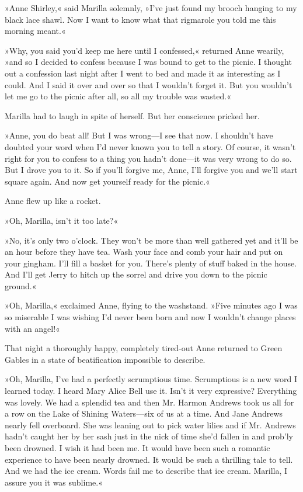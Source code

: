 »Anne Shirley,« said Marilla solemnly, »I’ve just found my brooch hanging to my black lace shawl. Now I want to know what that rigmarole you told me this morning meant.«

»Why, you said you’d keep me here until I confessed,« returned Anne wearily, »and so I decided to confess because I was bound to get to the picnic. I thought out a confession last night after I went to bed and made it as interesting as I could. And I said it over and over so that I wouldn’t forget it. But you wouldn’t let me go to the picnic after all, so all my trouble was wasted.«

Marilla had to laugh in spite of herself. But her conscience pricked her.

»Anne, you do beat all! But I was wrong—I see that now. I shouldn’t have doubted your word when I’d never known you to tell a story. Of course, it wasn’t right for you to confess to a thing you hadn’t done—it was very wrong to do so. But I drove you to it. So if you’ll forgive me, Anne, I’ll forgive you and we’ll start square again. And now get yourself ready for the picnic.«

Anne flew up like a rocket.

»Oh, Marilla, isn’t it too late?«

»No, it’s only two o’clock. They won’t be more than well gathered yet and it’ll be an hour before they have tea. Wash your face and comb your hair and put on your gingham. I’ll fill a basket for you. There’s plenty of stuff baked in the house. And I’ll get Jerry to hitch up the sorrel and drive you down to the picnic ground.«

»Oh, Marilla,« exclaimed Anne, flying to the washstand. »Five minutes ago I was so miserable I was wishing I’d never been born and now I wouldn’t change places with an angel!«

That night a thoroughly happy, completely tired-out Anne returned to Green Gables in a state of beatification impossible to describe.

»Oh, Marilla, I’ve had a perfectly scrumptious time. Scrumptious is a new word I learned today. I heard Mary Alice Bell use it. Isn’t it very expressive? Everything was lovely. We had a splendid tea and then Mr. Harmon Andrews took us all for a row on the Lake of Shining Waters—six of us at a time. And Jane Andrews nearly fell overboard. She was leaning out to pick water lilies and if Mr. Andrews hadn’t caught her by her sash just in the nick of time she’d fallen in and prob’ly been drowned. I wish it had been me. It would have been such a romantic experience to have been nearly drowned. It would be such a thrilling tale to tell. And we had the ice cream. Words fail me to describe that ice cream. Marilla, I assure you it was sublime.«

